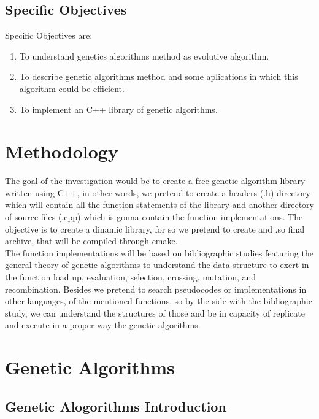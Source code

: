 \documentclass[letterpaper]{article}
\begin{document}
\subsection{Specific Objectives}

Specific Objectives are:\\

\begin{enumerate}
\item To understand genetics algorithms method as evolutive algorithm.
\item To describe genetic algorithms method and some aplications in which this algorithm could be efficient.
\item To implement an C++ library of genetic algorithms.
\end{enumerate}

\section{Methodology}

The goal of the investigation would be to create a free genetic algorithm library written using C++, in other words, we pretend to create a headers (.h) directory which will contain all the function statements of the library and another directory of source files (.cpp) which is gonna contain the function implementations. The objective is to create a dinamic library, for so we pretend to create and .so final archive, that will be compiled through cmake.
\\
The function implementations will be based on bibliographic studies featuring the general theory of genetic algorithms to understand the data structure to exert in the function load up, evaluation, selection, crossing, mutation, and recombination. Besides we pretend to search pseudocodes or implementations in other languages, of the mentioned functions, so by the side with the bibliographic study, we can understand the structures of those and be in capacity of replicate and execute in a proper way the genetic algorithms.
\\


\section{Genetic Algorithms}

\subsection{Genetic Alogorithms Introduction}
\end{document}
